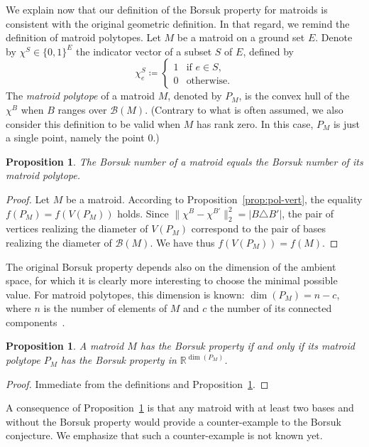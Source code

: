 \documentclass[12pt]{amsart}
\theoremstyle{plain}
\newtheorem{proposition}[theorem]{Proposition}
\theoremstyle{definition}
\theoremstyle{remark}
\newcommand{\R}{\mathbb{R}}
\def \B {\mathcal{B}}
\begin{document}
We explain now that our definition of the Borsuk property for matroids is consistent with the original geometric definition. In that regard, we remind the definition of matroid polytopes. Let $M$ be a matroid on a ground set $E$. Denote by $\chi^S \in \{0,1\}^E$ the indicator vector of a subset $S$ of $E$, defined by 
\[
\chi^S_e \coloneqq \left \{ \begin{array}{rl} 1 & \text{if $e \in S$,} \\ 0 & \text{otherwise.} \end{array}\right.
\]
The {\em matroid polytope} of a matroid $M$, denoted by $P_M$, is the convex hull of the $\chi^B$ when $B$ ranges over $\B(M)$.  (Contrary to what is often assumed, we also consider this definition to be valid when $M$ has rank zero. In this case, $P_M$ is just a single point, namely the point $0$.)

\begin{proposition}\label{prop:numb}
The Borsuk number of a matroid equals the Borsuk number of its matroid polytope.
\end{proposition}

\begin{proof}
Let $M$ be a matroid. According to Proposition~\ref{prop:pol-vert}, the equality $f(P_M) = f(V(P_M))$ holds. Since $\|\chi^B - \chi^{B'}\|_2^2 = |B \triangle B'|$, the pair of vertices realizing the diameter of $V(P_M)$ correspond to the pair of bases realizing the diameter of $\B(M)$. We have thus $f(V(P_M)) = f(M)$.
\end{proof}

The original Borsuk property depends also on the dimension of the ambient space, for which it is clearly more interesting to choose the minimal possible value. For matroid polytopes, this dimension is known: $\dim(P_M) = n - c$, where $n$ is the number of elements of $M$ and $c$ the number of its connected components~\cite{oxley2011matroid}.

\begin{proposition}\label{prop:comb-geo}
A matroid $M$ has the Borsuk property if and only if its matroid polytope $P_M$ has the Borsuk property in $\R^{\dim(P_M)}$.
\end{proposition}

\begin{proof}
Immediate from the definitions and Proposition~\ref{prop:numb}.
\end{proof}

A consequence of Proposition~\ref{prop:comb-geo} is that any matroid with at least two bases and without the Borsuk property would provide a counter-example to the Borsuk conjecture. We emphasize that such a counter-example is not known yet.
 
\end{document}
